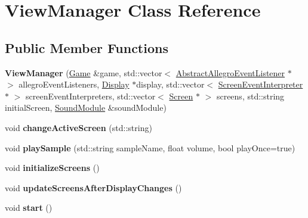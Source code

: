 \hypertarget{classViewManager}{}\section{View\+Manager Class Reference}
\label{classViewManager}
\subsection*{Public Member Functions}
\begin{DoxyCompactItemize}
\item 
{\bfseries View\+Manager} (\hyperlink{classGame}{Game} \&game, std\+::vector$<$ \hyperlink{classAbstractAllegroEventListener}{Abstract\+Allegro\+Event\+Listener} $\ast$ $>$ allegro\+Event\+Listeners, \hyperlink{classDisplay}{Display} $\ast$display, std\+::vector$<$ \hyperlink{classScreenEventInterpreter}{Screen\+Event\+Interpreter} $\ast$ $>$ screen\+Event\+Interpreters, std\+::vector$<$ \hyperlink{classScreen}{Screen} $\ast$ $>$ screens, std\+::string initial\+Screen, \hyperlink{classSoundModule}{Sound\+Module} \&sound\+Module)\hypertarget{classViewManager_a684ecb6174c1af078bb112fd568d24e3}{}\label{classViewManager_a684ecb6174c1af078bb112fd568d24e3}

\item 
void {\bfseries change\+Active\+Screen} (std\+::string)\hypertarget{classViewManager_af91f677e59971904b9787ba8770b378e}{}\label{classViewManager_af91f677e59971904b9787ba8770b378e}

\item 
void {\bfseries play\+Sample} (std\+::string sample\+Name, float volume, bool play\+Once=true)\hypertarget{classViewManager_a9ce139d86ba73580c327cd2eac4763b4}{}\label{classViewManager_a9ce139d86ba73580c327cd2eac4763b4}

\item 
void {\bfseries initialize\+Screens} ()\hypertarget{classViewManager_a8201bca571eb89c02dc0fd6c1da5018e}{}\label{classViewManager_a8201bca571eb89c02dc0fd6c1da5018e}

\item 
void {\bfseries update\+Screens\+After\+Display\+Changes} ()\hypertarget{classViewManager_ac340733c77d4d0ed4dbe453a86b465b0}{}\label{classViewManager_ac340733c77d4d0ed4dbe453a86b465b0}

\item 
void {\bfseries start} ()\hypertarget{classViewManager_a0f797d9cb4e2306276dd4419d20d3fc7}{}\label{classViewManager_a0f797d9cb4e2306276dd4419d20d3fc7}


\end{DoxyCompactItemize}
